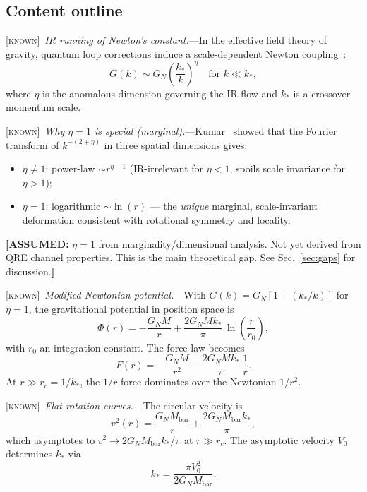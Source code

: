 \documentclass[prl,twocolumn,superscriptaddress,longbibliography,floatfix]{revtex4-2}
\newcommand{\known}{\textsc{[known]}}
\newcommand{\assumed}[1]{{\color{orange}\textbf{[ASSUMED:} #1\textbf{]}}}
\begin{document}
\subsection*{Content outline}

\known\ \emph{IR running of Newton's constant.}---In the effective
field theory of gravity, quantum loop corrections induce a
scale-dependent Newton coupling~\cite{Reuter1998,ReuterWeyer2004}:
\begin{equation}
G(k) \sim G_N \!\left(\frac{k_*}{k}\right)^{\!\eta}
\quad \text{for } k \ll k_*,
\label{eq:running_G}
\end{equation}
where $\eta$ is the anomalous dimension governing the IR flow and
$k_*$ is a crossover momentum scale.

\known\ \emph{Why $\eta = 1$ is special (marginal).}---Kumar~\cite{Kumar2025}
showed that the Fourier transform of $k^{-(2+\eta)}$ in three
spatial dimensions gives:
\begin{itemize}
\item $\eta \neq 1$: power-law $\sim r^{\eta - 1}$ (IR-irrelevant
  for $\eta < 1$, spoils scale invariance for $\eta > 1$);
\item $\eta = 1$: logarithmic $\sim \ln(r)$ --- the \emph{unique}
  marginal, scale-invariant deformation consistent with rotational
  symmetry and locality.
\end{itemize}

\assumed{$\eta = 1$ from marginality/dimensional analysis. Not yet
derived from QRE channel properties. This is the main theoretical
gap. See Sec.~\ref{sec:gaps} for discussion.}

\known\ \emph{Modified Newtonian potential.}---With
$G(k) = G_N[1 + (k_*/k)]$ for $\eta = 1$, the gravitational
potential in position space is~\cite{Kumar2025}
\begin{equation}
\boxed{
\Phi(r) = -\frac{G_N M}{r}
  + \frac{2G_N M k_*}{\pi}\,\ln\!\left(\frac{r}{r_0}\right),
}
\label{eq:phi_log}
\end{equation}
with $r_0$ an integration constant. The force law becomes
\begin{equation}
F(r) = -\frac{G_N M}{r^2}
  - \frac{2G_N M k_*}{\pi}\,\frac{1}{r}.
\label{eq:force_log}
\end{equation}
At $r \gg r_c = 1/k_*$, the $1/r$ force dominates over the
Newtonian $1/r^2$.

\known\ \emph{Flat rotation curves.}---The circular velocity is
\begin{equation}
v^2(r) = \frac{G_N M_{\mathrm{bar}}}{r}
  + \frac{2G_N M_{\mathrm{bar}} k_*}{\pi},
\label{eq:v_flat}
\end{equation}
which asymptotes to $v^2 \to 2G_N M_{\mathrm{bar}} k_*/\pi$
at $r \gg r_c$. The asymptotic velocity $V_0$ determines $k_*$
via~\cite{Kumar2025}
\begin{equation}
k_* = \frac{\pi V_0^2}{2G_N M_{\mathrm{bar}}}.
\label{eq:kstar}
\end{equation}
\end{document}
